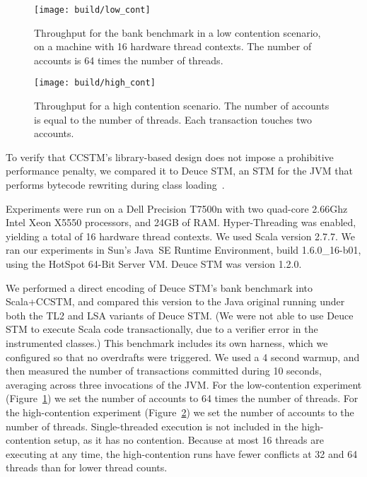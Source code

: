 
\begin{figure}
  \centering \texttt{[image: build/low\_cont]}

\caption{Throughput for the bank benchmark in a low contention scenario,
on a machine with 16 hardware thread contexts.  The number of accounts
is 64 times the number of threads.}

  \label{fig:lowcont}
\end{figure}

\begin{figure}
  \centering \texttt{[image: build/high\_cont]}

\caption{Throughput for a high contention scenario.  The number of accounts is
equal to the number of threads.  Each transaction touches two accounts.}

  \label{fig:highcont}
\end{figure}

To verify that CCSTM's library-based design does not impose a prohibitive
performance penalty, we compared it to Deuce STM, an STM for the JVM that
performs bytecode rewriting during class loading~\cite{deucestm}.

Experiments were run on a Dell Precision T7500n with two quad-core
2.66Ghz Intel Xeon X5550 processors, and 24GB of RAM.  Hyper-Threading was
enabled, yielding a total of 16 hardware thread contexts.  We used Scala
version 2.7.7.  We ran our experiments in
Sun's Java~SE Runtime Environment, build 1.6.0\_16-b01, using the HotSpot
64-Bit Server VM.  Deuce STM was version 1.2.0.

We performed a direct encoding of Deuce STM's bank benchmark into
Scala+CCSTM, and compared this version to the Java original running under
both the TL2 and LSA variants of Deuce STM.  (We were not able to use
Deuce STM to execute Scala code transactionally, due to a verifier error
in the instrumented classes.)  This benchmark includes its own harness,
which we configured so that no overdrafts were triggered.  We used a
4 second warmup, and then measured the number of transactions committed
during 10 seconds, averaging across three invocations of the JVM.  For the
low-contention experiment (Figure~\ref{fig:lowcont}) we set the number
of accounts to 64 times the number of threads.  For the high-contention
experiment (Figure~\ref{fig:highcont}) we set the number of accounts to
the number of threads.  Single-threaded execution is not included in the
high-contention setup, as it has no contention.  Because at most
16 threads are executing at any time, the high-contention runs have
fewer conflicts at 32 and 64 threads than for lower thread counts.

